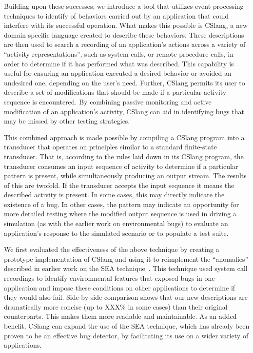 Building upon these successes,
we introduce a tool
that utilizes event processing techniques
to identify
of behaviors carried out by an application
that could interfere with its successful operation.
What makes this possible is CSlang,
a new domain specific language
created to describe these behaviors.
These descriptions are then used
to search a recording of an application's actions
across a variety of ``activity representations'',
such as system calls,
or remote procedure calls,
in order to determine if it has
performed what was described.
This capability is useful
for ensuring an application executed a desired behavior
or avoided an undesired one,
depending on the user's need.
Further, CSlang permits
its user to describe a set of modifications
that should be made
if a particular activity sequence is encountered.
By combining passive monitoring and active modification
of an application's activity,
CSlang can aid in identifying bugs
that may be missed by other testing strategies.

This combined approach is made possible
by compiling a CSlang program
into a transducer
that operates on principles similar
to a standard finite-state transducer.
That is,
according to the rules laid down in its CSlang program,
the transducer consumes an input sequence of activity
to determine if a particular pattern is present,
while simultaneously producing an output stream.
The results of this are twofold.
If the transducer accepts the input sequence
it means the described activity is present.
In some cases,
this may directly indicate
the existence of a bug.
In other cases,
the pattern may
indicate an opportunity
for more detailed testing
where the modified output sequence is used
in driving a simulation (as with the earlier work on environmental bugs)
to evaluate an application's response to the simulated scenario
or to populate a test suite.

We first evaluated the effectiveness of the above technique
by creating a prototype implementation of CSlang
and using it to
reimplement the ``anomalies''
described in earlier work on the SEA technique~\cite{DBLP:conf/issre/MooreCFW19}.
This technique used system call recordings
to identify environmental features that
exposed bugs in one application
and impose these conditions on other applications
to determine if they would also fail.
Side-by-side comparison shows that our new
descriptions are dramatically more concise (up to XXX\% in some cases)
than their original counterparts.
This makes them
more readable
and maintainable.
As an added benefit,
CSlang can expand the use of the SEA technique,
which has already been proven
to be an effective bug detector,
by facilitating its use
on a wider variety of applications.


